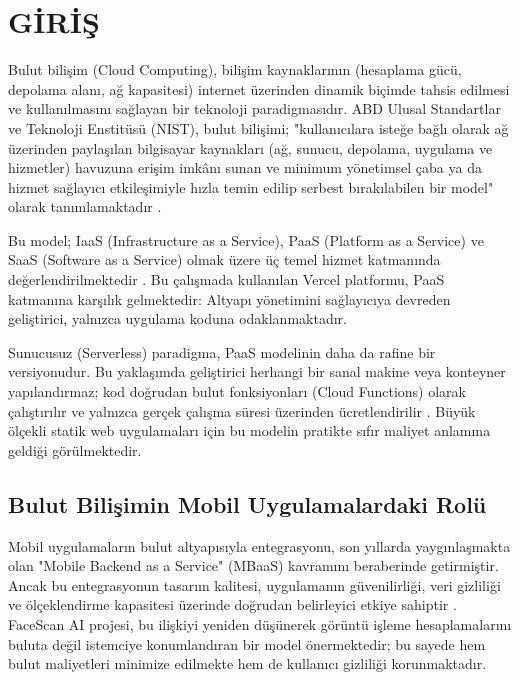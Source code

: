 \section{GİRİŞ}

Bulut bilişim (Cloud Computing), bilişim kaynaklarının (hesaplama gücü, depolama alanı, ağ kapasitesi) internet üzerinden dinamik biçimde tahsis edilmesi ve kullanılmasını sağlayan bir teknoloji paradigmasıdır. ABD Ulusal Standartlar ve Teknoloji Enstitüsü (NIST), bulut bilişimi; "kullanıcılara isteğe bağlı olarak ağ üzerinden paylaşılan bilgisayar kaynakları (ağ, sunucu, depolama, uygulama ve hizmetler) havuzuna erişim imkânı sunan ve minimum yönetimsel çaba ya da hizmet sağlayıcı etkileşimiyle hızla temin edilip serbest bırakılabilen bir model" olarak tanımlamaktadır \cite{mell2011nist}.

Bu model; IaaS (Infrastructure as a Service), PaaS (Platform as a Service) ve SaaS (Software as a Service) olmak üzere üç temel hizmet katmanında değerlendirilmektedir \cite{rimal2009taxonomy}. Bu çalışmada kullanılan Vercel platformu, PaaS katmanına karşılık gelmektedir: Altyapı yönetimini sağlayıcıya devreden geliştirici, yalnızca uygulama koduna odaklanmaktadır.

Sunucusuz (Serverless) paradigma, PaaS modelinin daha da rafine bir versiyonudur. Bu yaklaşımda geliştirici herhangi bir sanal makine veya konteyner yapılandırmaz; kod doğrudan bulut fonksiyonları (Cloud Functions) olarak çalıştırılır ve yalnızca gerçek çalışma süresi üzerinden ücretlendirilir \cite{jonas2019cloud}. Büyük ölçekli statik web uygulamaları için bu modelin pratikte sıfır maliyet anlamına geldiği görülmektedir.

\subsection{Bulut Bilişimin Mobil Uygulamalardaki Rolü}

Mobil uygulamaların bulut altyapısıyla entegrasyonu, son yıllarda yaygınlaşmakta olan "Mobile Backend as a Service" (MBaaS) kavramını beraberinde getirmiştir. Ancak bu entegrasyonun tasarım kalitesi, uygulamanın güvenilirliği, veri gizliliği ve ölçeklendirme kapasitesi üzerinde doğrudan belirleyici etkiye sahiptir \cite{buyya2009cloud}. FaceScan AI projesi, bu ilişkiyi yeniden düşünerek görüntü işleme hesaplamalarını buluta değil istemciye konumlandıran bir model önermektedir; bu sayede hem bulut maliyetleri minimize edilmekte hem de kullanıcı gizliliği korunmaktadır.


